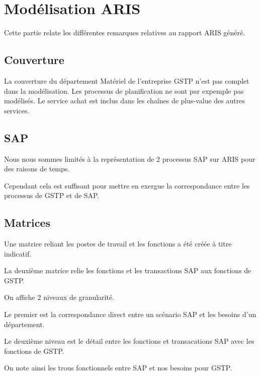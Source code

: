 \section{Modélisation ARIS}

Cette partie relate les différentes remarques relatives au rapport ARIS généré. 

\subsection{Couverture}

La couverture du département Matériel de l'entreprise GSTP n'est pas complet 
dans la modélisation. Les processus de planification ne sont par expemple pas 
modélisés. Le service achat est inclus dans les chaînes de plus-value des autres 
services.

\subsection{SAP}

Nous nous sommes limités à la représentation de 2 processus SAP sur ARIS pour 
des raisons de temps.

Cependant cela est suffisant pour mettre en exergue la correspondance entre les 
processus de GSTP et de SAP.

\subsection{Matrices}

Une matrice reliant les postes de travail et les fonctions a été créée à titre 
indicatif.

La deuxième matrice relie les fonctions et les transactions SAP aux fonctions 
de GSTP.

On affiche 2 niveaux de granularité.

Le premier est la correspondance direct entre un scénario SAP et les besoins 
d'un département. 

Le deuxième niveau est le détail entre les fonctions et transacations SAP avec 
les fonctions de GSTP.

On note ainsi les trous fonctionnels entre SAP et nos besoins pour GSTP.
